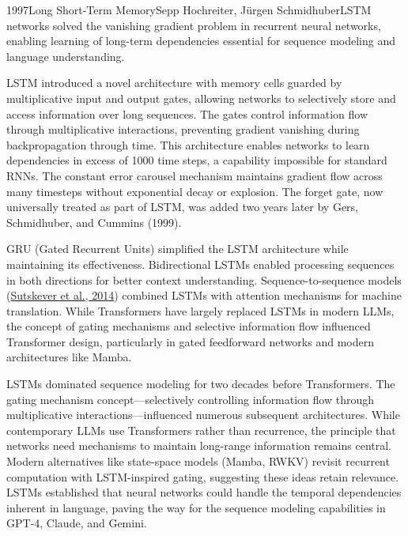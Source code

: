 
\begin{papersummary}{1997}{Long Short-Term Memory}{Sepp Hochreiter, J\"urgen Schmidhuber}{LSTM networks solved the vanishing gradient problem in recurrent neural networks, enabling learning of long-term dependencies essential for sequence modeling and language understanding.}

LSTM introduced a novel architecture with memory cells guarded by multiplicative input and output gates, allowing networks to selectively store and access information over long sequences. The gates control information flow through multiplicative interactions, preventing gradient vanishing during backpropagation through time. This architecture enables networks to learn dependencies in excess of 1000 time steps, a capability impossible for standard RNNs. The constant error carousel mechanism maintains gradient flow across many timesteps without exponential decay or explosion. The forget gate, now universally treated as part of LSTM, was added two years later by Gers, Schmidhuber, and Cummins (1999).

GRU (Gated Recurrent Units) simplified the LSTM architecture while maintaining its effectiveness. Bidirectional LSTMs enabled processing sequences in both directions for better context understanding. Sequence-to-sequence models (\hyperref[paper:sutskever-2014]{Sutskever et al., 2014}) combined LSTMs with attention mechanisms for machine translation. While Transformers have largely replaced LSTMs in modern LLMs, the concept of gating mechanisms and selective information flow influenced Transformer design, particularly in gated feedforward networks and modern architectures like Mamba.

LSTMs dominated sequence modeling for two decades before Transformers. The gating mechanism concept—selectively controlling information flow through multiplicative interactions—influenced numerous subsequent architectures. While contemporary LLMs use Transformers rather than recurrence, the principle that networks need mechanisms to maintain long-range information remains central. Modern alternatives like state-space models (Mamba, RWKV) revisit recurrent computation with LSTM-inspired gating, suggesting these ideas retain relevance. LSTMs established that neural networks could handle the temporal dependencies inherent in language, paving the way for the sequence modeling capabilities in GPT-4, Claude, and Gemini.

\end{papersummary}
